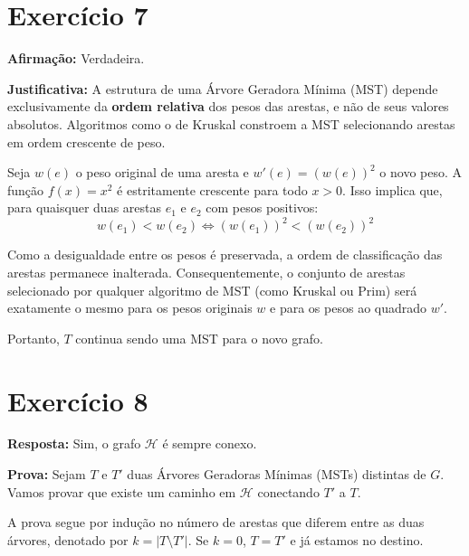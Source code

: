 \documentclass[a4paper,12pt]{article}
\begin{document}
\newpage
\section*{Exercício 7}

\textbf{Afirmação:} Verdadeira.

\textbf{Justificativa:}
A estrutura de uma Árvore Geradora Mínima (MST) depende exclusivamente da \textbf{ordem relativa} dos pesos das arestas, e não de seus valores absolutos. Algoritmos como o de Kruskal constroem a MST selecionando arestas em ordem crescente de peso.

Seja $w(e)$ o peso original de uma aresta e $w'(e) = (w(e))^2$ o novo peso.
A função $f(x) = x^2$ é estritamente crescente para todo $x > 0$.
Isso implica que, para quaisquer duas arestas $e_1$ e $e_2$ com pesos positivos:
$$w(e_1) < w(e_2) \iff (w(e_1))^2 < (w(e_2))^2$$

Como a desigualdade entre os pesos é preservada, a ordem de classificação das arestas permanece inalterada. Consequentemente, o conjunto de arestas selecionado por qualquer algoritmo de MST (como Kruskal ou Prim) será exatamente o mesmo para os pesos originais $w$ e para os pesos ao quadrado $w'$.

Portanto, $T$ continua sendo uma MST para o novo grafo.

\newpage
\section*{Exercício 8}

\textbf{Resposta:} Sim, o grafo $\mathcal{H}$ é sempre conexo.

\textbf{Prova:}
Sejam $T$ e $T'$ duas Árvores Geradoras Mínimas (MSTs) distintas de $G$. Vamos provar que existe um caminho em $\mathcal{H}$ conectando $T'$ a $T$.

A prova segue por indução no número de arestas que diferem entre as duas árvores, denotado por $k = |T \setminus T'|$.
Se $k=0$, $T=T'$ e já estamos no destino.
\end{document}
